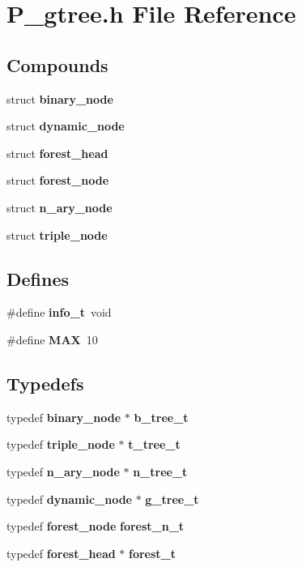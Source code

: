 \section{P\_\-gtree.h File Reference}
\label{P__gtree_8h}
\subsection*{Compounds}
\begin{CompactItemize}
\item 
struct {\bf binary\_\-node}
\item 
struct {\bf dynamic\_\-node}
\item 
struct {\bf forest\_\-head}
\item 
struct {\bf forest\_\-node}
\item 
struct {\bf n\_\-ary\_\-node}
\item 
struct {\bf triple\_\-node}
\end{CompactItemize}
\subsection*{Defines}
\begin{CompactItemize}
\item 
\#define {\bf info\_\-t}\ void
\item 
\#define {\bf MAX}\ 10
\end{CompactItemize}
\subsection*{Typedefs}
\begin{CompactItemize}
\item 
typedef {\bf binary\_\-node} $\ast$ {\bf b\_\-tree\_\-t}
\item 
typedef {\bf triple\_\-node} $\ast$ {\bf t\_\-tree\_\-t}
\item 
typedef {\bf n\_\-ary\_\-node} $\ast$ {\bf n\_\-tree\_\-t}
\item 
typedef {\bf dynamic\_\-node} $\ast$ {\bf g\_\-tree\_\-t}
\item 
typedef {\bf forest\_\-node} {\bf forest\_\-n\_\-t}
\item 
typedef {\bf forest\_\-head} $\ast$ {\bf forest\_\-t}
\end{CompactItemize}
